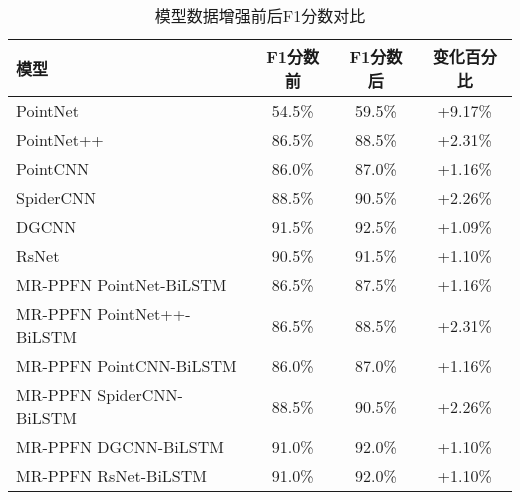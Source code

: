 \begin{table}[htbp]
    \begin{subtable}{\linewidth}
        \centering
        \caption{模型数据增强前后F1分数对比}
        \begin{tabular}{lc|cc}
            \toprule
            \textbf{模型} & \textbf{F1分数前} & \textbf{F1分数后} & \textbf{变化百分比} \\
            \midrule
            PointNet & 54.5\% & 59.5\% & +9.17\% \\
            PointNet++ & 86.5\% & 88.5\% & +2.31\% \\
            PointCNN & 86.0\% & 87.0\% & +1.16\% \\
            SpiderCNN & 88.5\% & 90.5\% & +2.26\% \\
            DGCNN & 91.5\% & 92.5\% & +1.09\% \\
            RsNet & 90.5\% & 91.5\% & +1.10\% \\
            MR-PPFN PointNet-BiLSTM & 86.5\% & 87.5\% & +1.16\% \\
            MR-PPFN PointNet++-BiLSTM & 86.5\% & 88.5\% & +2.31\% \\
            MR-PPFN PointCNN-BiLSTM & 86.0\% & 87.0\% & +1.16\% \\
            MR-PPFN SpiderCNN-BiLSTM & 88.5\% & 90.5\% & +2.26\% \\
            MR-PPFN DGCNN-BiLSTM & 91.0\% & 92.0\% & +1.10\% \\
            MR-PPFN RsNet-BiLSTM & 91.0\% & 92.0\% & +1.10\% \\
            \bottomrule
        \end{tabular}
        \label{tab:f1-comparison}
    \end{subtable}
\end{table}
 


